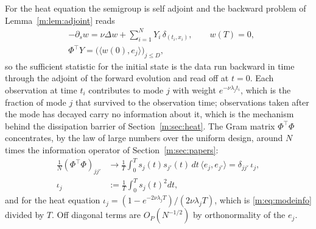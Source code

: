 For the heat equation the semigroup is self adjoint and the backward problem of Lemma~\ref{m:lem:adjoint} reads
\begin{equation}\label{m:eq:adjoint}
\begin{aligned}
&-\partial_sw=\nu\Delta w+\sum_{i=1}^NY_i\,\delta_{(t_i,x_i)},\qquad w(T)=0,\\
&\Phi^\top Y=\big(\langle w(0),e_j\rangle\big)_{j\le D},
\end{aligned}
\end{equation}
so the sufficient statistic for the initial state is the data run backward in time through the adjoint of the forward evolution and read off at $t=0$. Each observation at time $t_i$ contributes to mode $j$ with weight $e^{-\nu\lambda_jt_i}$, which is the fraction of mode $j$ that survived to the observation time; observations taken after the mode has decayed carry no information about it, which is the mechanism behind the dissipation barrier of Section~\ref{m:sec:heat}. The Gram matrix $\Phi^\top\Phi$ concentrates, by the law of large numbers over the uniform design, around $N$ times the information operator of Section~\ref{m:sec:papers}:
\begin{equation}\label{m:eq:gram}
\begin{aligned}
\frac1N(\Phi^\top\Phi)_{jj'}&\to\frac1T\int_0^Ts_j(t)s_{j'}(t)\,dt\,\langle e_j,e_{j'}\rangle=\delta_{jj'}\,\iota_j,\\
\iota_j&:=\frac1T\int_0^Ts_j(t)^2dt ,
\end{aligned}
\end{equation}
and for the heat equation $\iota_j=(1-e^{-2\nu\lambda_jT})/(2\nu\lambda_jT)$, which is \eqref{m:eq:modeinfo} divided by $T$. Off diagonal terms are $O_P(N^{-1/2})$ by orthonormality of the $e_j$.

